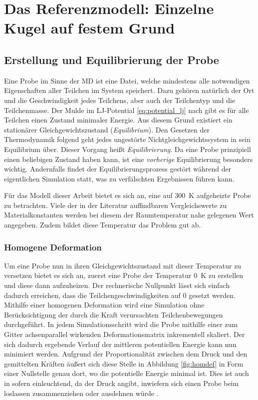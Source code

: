 \chapter{Das Referenzmodell: Einzelne Kugel auf festem Grund}



\section{Erstellung und Equilibrierung der Probe}
	Eine Probe im Sinne der MD ist eine Datei, welche mindestens alle notwendigen Eigenschaften
	aller Teilchen im System speichert. Dazu gehören natürlich der Ort und die Geschwindigkeit
	jedes Teilchens, aber auch der Teilchentyp und die Teilchenmasse. Der Mulde im LJ-Potential
	\eqref{eq:potential_lj} nach gibt es für alle Teilchen einen Zustand minimaler Energie.
	Aus diesem Grund existiert ein stationärer Gleichgewichtszustand (\emph{Equilibrium}). Den
	Gesetzen der Thermodynamik folgend geht jedes ungestörte Nichtgleichgewichtssystem in sein
	Equilibrium über. Dieser Vorgang heißt \emph{Equilibrierung}. Da eine Probe prinzipiell einen
	beliebigen Zustand haben kann, ist eine \emph{vorherige} Equilibrierung besonders wichtig.
	Andernfalls findet der Equilibrierungsprozess gestört während der eigentlichen Simulation
	statt, was zu verfälschten Ergebnissen führen kann.

	Für das Modell dieser Arbeit bietet es sich an, eine auf \SI{300}{\kelvin} aufgeheizte Probe
	zu betrachten. Viele der in der Literatur auffindbaren Vergleichswerte zu Materialkonstanten
	werden bei diesem der Raumtemperatur nahe gelegenen Wert angegeben. Zudem bildet diese
	Temperatur das Problem gut ab.

	\subsection{Homogene Deformation}
		Um eine Probe nun in ihren Gleichgewichtszustand mit dieser Temperatur zu versetzen bietet
		es sich an, zuerst eine Probe der Temperatur \SI{0}{\kelvin} zu erstellen und diese dann
		aufzuheizen. Der rechnerische Nullpunkt lässt sich einfach dadurch erreichen, dass die
		Teilchengeschwindigkeiten auf 0 gesetzt werden. Mithilfe einer homogenen Deformation wird
		eine Simulation ohne Berücksichtigung der durch die Kraft verursachten Teilchenbewegungen
		durchgeführt. In jedem Simulationsschritt wird die Probe mithilfe einer zum Gitter
		achsenparallel wirkenden Deformationsmatrix inkrementell skaliert. Der sich dadurch
		ergebende Verlauf der mittleren potentiellen Energie kann nun minimiert werden. Aufgrund
		der Proportionalität zwischen dem Druck und den gemittelten Kräften äußert sich diese
		Stelle in Abbildung \ref{fig:homdef} in Form einer Nullstelle genau dort, wo die
		potentielle Energie minimal ist. Dies ist auch in sofern einleuchtend, da der Druck
		angibt, inwiefern sich einen Probe beim loslassen zusammenziehen oder ausdehnen würde
		\cite{rapp2014laserablation}.

